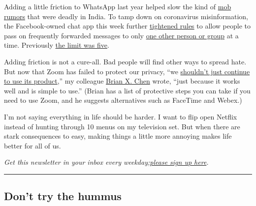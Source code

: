 Adding a little friction to WhatsApp last year helped slow the kind of
\href{https://www.nytimes3xbfgragh.onion/interactive/2018/07/18/technology/whatsapp-india-killings.html}{mob
rumors} that were deadly in India. To tamp down on coronavirus
misinformation, the Facebook-owned chat app this week further
\href{https://blog.whatsapp.com/Keeping-WhatsApp-Personal-and-Private}{tightened
rules} to allow people to pass on frequently forwarded messages to only
\href{https://www.wsj.com/articles/facebooks-whatsapp-battles-coronavirus-misinformation-11586256870}{one
other person or group} at a time. Previously
\href{https://www.reuters.com/article/us-facebook-whatsapp/facebooks-whatsapp-limits-text-forwards-to-five-recipients-to-curb-rumors-idUSKCN1PF0TP}{the
limit was five}.

Adding friction is not a cure-all. Bad people will find other ways to
spread hate. But now that Zoom has failed to protect our privacy, ``we
\href{https://www.nytimes3xbfgragh.onion/article/zoom-privacy-lessons.html}{shouldn't
just continue to use its product},'' my colleague
\href{https://www.nytimes3xbfgragh.onion/by/brian-x-chen}{Brian X. Chen}
wrote, ``just because it works well and is simple to use.'' (Brian has a
list of protective steps you can take if you need to use Zoom, and he
suggests alternatives such as FaceTime and Webex.)

I'm not saying everything in life should be harder. I want to flip open
Netflix instead of hunting through 10 menus on my television set. But
when there are stark consequences to easy, making things a little more
annoying makes life better for all of us.

\emph{Get this newsletter in your inbox every
weekday;}\href{https://nl.nytimes3xbfgragh.onion/f/a/PLwk0gEp9CAyb88oA51ILQ~~/AAAAAQA~/RgRgby-OP0TQaHR0cHM6Ly93d3cubnl0aW1lcy5jb20vbmV3c2xldHRlcnMvc2lnbnVwL09UP2NhbXBhaWduX2lkPTE1OCZlbWM9ZWRpdF9vdF8yMDIwMDQwNyZpbnN0YW5jZV9pZD0xNzQ0NSZubD1vbi10ZWNoLXdpdGgtc2hpcmEtb3ZpZGUmcmVnaV9pZD02NzA0NzE1NCZzZWdtZW50X2lkPTI0MTgyJnRlPTEmdXNlcl9pZD00Y2RmZDMyYzc3Zjg0ZDc3MzRkNzZjYjA4ODIwNjA4YlcDbnl0QgoAKo6qjF5xBcb0UhhoYW5uYS5pbmdiZXJAbnl0aW1lcy5jb21YBAAAAAA~}{\emph{please
sign up here}}\emph{.}

\begin{center}\rule{0.5\linewidth}{\linethickness}\end{center}

\hypertarget{dont-try-the-hummus}{%
\subsection{Don't try the hummus}\label{dont-try-the-hummus}}


